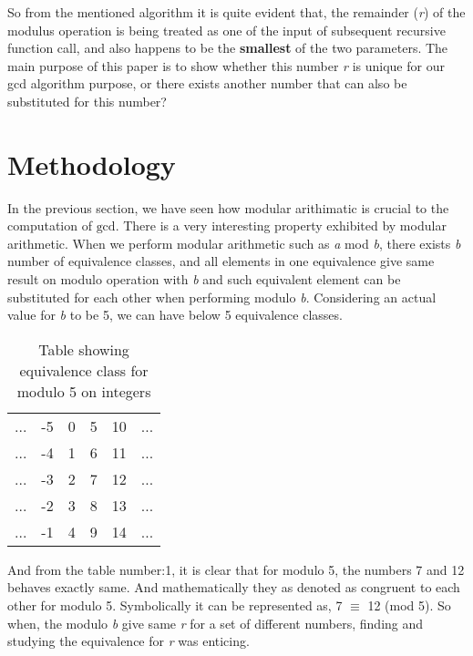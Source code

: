 \documentclass[conference,compsoc]{IEEEtran}
\newcommand{\var}[1]{\textit{#1}}
\renewcommand{\gcd}{\text{gcd}}
\begin{document}
So from the mentioned algorithm it is quite evident that, the remainder (\var{r}) of the modulus operation is being treated as one of the input of subsequent recursive function call, and also happens to be the \textbf{smallest} of the two parameters.
The main purpose of this paper is to show whether this number \var{r} is unique for our gcd algorithm purpose, or there exists another number that can also be substituted for this number?

\section{Methodology}
In the previous section, we have seen how modular arithimatic is crucial to the computation of $\gcd$. There is a very interesting property exhibited by modular arithmetic.
When we perform modular arithmetic such as \var{a} mod \var{b}, there exists
\var{b} number of equivalence classes, and all elements in one equivalence give same result on modulo operation with \var{b} and such equivalent element can be substituted for each other when performing modulo \var{b}.
\newline
Considering an actual value for \var{b} to be 5, we can have below 5 equivalence classes.

\begin{table}[!htbp]
\renewcommand{\arraystretch}{1.3}
\caption{Table showing equivalence class for modulo 5 on integers}
\label{table:1}
\centering
	\begin{tabular}{c c c c c c}
		... & -5 & 0 & 5 & 10 & ... \\
		... & -4 & 1 & 6 & 11 & ... \\
		... & -3 & 2 & 7 & 12 & ... \\
		... & -2 & 3 & 8 & 13 & ... \\
		... & -1 & 4 & 9 & 14 & ...
	\end{tabular}
\end{table}

And from the table number:1, it is clear that for modulo 5, the numbers 7 and 12 behaves exactly same. And mathematically they as denoted as congruent to each other for modulo 5.
Symbolically it can be represented as, 7 $\equiv$ 12 (mod 5).
So when, the modulo \var{b} give same \var{r} for a set of different numbers, finding and studying the equivalence for \var{r} was enticing.
\end{document}
